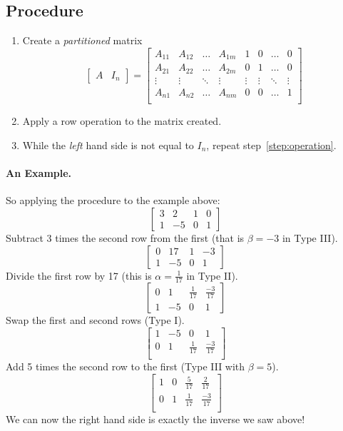 \subsection{Procedure}
\begin{enumerate}
\item Create a \textit{partitioned} matrix 
\[
\left[\begin{array}{c|c}A&I_n\end{array}\right] = 
\left[\begin{array}{cccc|cccc}
A_{11} & A_{12} & \hdots & A_{1m} & 1 & 0 & \hdots & 0\\
A_{21} & A_{22} & \hdots & A_{2m} & 0 & 1 & \hdots & 0\\
\vdots & \vdots & \ddots & \vdots &\vdots & \vdots & \ddots & \vdots \\
A_{n1} & A_{n2} & \hdots & A_{nm} & 0 & 0 & \hdots & 1\\
\end{array}\right]
\]
\item Apply a row operation to the matrix created.\label{step:operation}
\item While the \textit{left} hand side is not equal to $I_n$, repeat step~\ref{step:operation}.
\end{enumerate}

\paragraph{An Example.} So applying the procedure to the example above: 
\[\left[\begin{array}{cc|cc} 3 & 2 & 1 & 0\\ 1 & -5 & 0 & 1\end{array}\right]\]
Subtract 3 times the second row from the first (that is $\beta=-3$ in Type III).
\[\left[\begin{array}{cc|cc} 0 & 17 & 1 & -3\\ 1 & -5 & 0 & 1\end{array}\right]\]
Divide the first row by 17 (this is $\alpha=\frac{1}{17}$ in Type II).
\[\left[\begin{array}{cc|cc} 0 & 1 & \frac{1}{17} & \frac{-3}{17}\\ 1 & -5 & 0 & 1\end{array}\right]\]
Swap the first and second rows (Type I).
\[\left[\begin{array}{cc|cc}  1 & -5 & 0 & 1\\0 & 1 & \frac{1}{17} & \frac{-3}{17}\\\end{array}\right]\]
Add 5 times the second row to the first (Type III with $\beta=5$).
\[\left[\begin{array}{cc|cc}  1 & 0 & \frac{5}{17} & \frac{2}{17}\\0 & 1 & \frac{1}{17} & \frac{-3}{17}\\\end{array}\right]\]
We can now the right hand side is exactly the inverse we saw above! 

